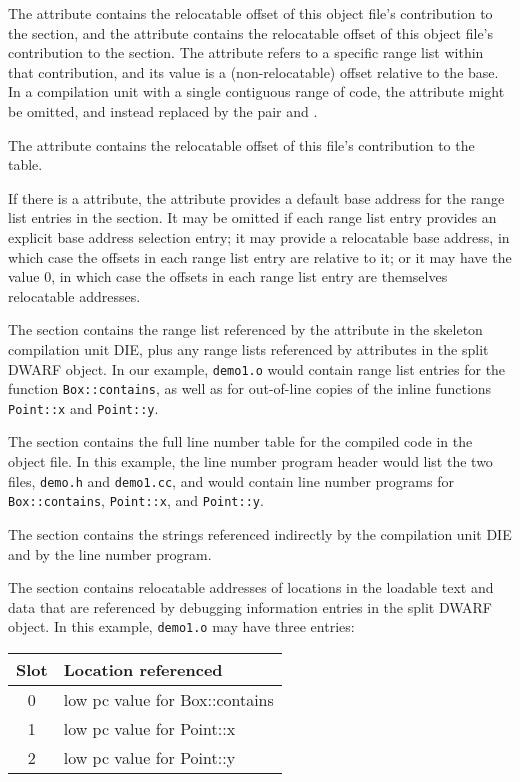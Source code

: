 The \DWATaddrbase{} attribute contains the relocatable offset of
this object file's contribution to the \dotdebugaddr{} section, and
the \DWATrangesbase{} attribute contains the relocatable offset
of this object file's contribution to the \dotdebugranges{} section.
The \DWATranges{} attribute refers to a specific range list within
that contribution, and its value is a (non-relocatable) offset
relative to the base. In a compilation unit with a single
contiguous range of code, the \DWATranges{} attribute might be
omitted, and instead replaced by the pair \DWATlowpc{} and
\DWAThighpc.

The \DWATstmtlist{} attribute contains the relocatable offset of
this file's contribution to the \dotdebugline{} table.

If there is a \DWATranges{} attribute, the \DWATlowpc{} attribute
provides a default base address for the range list entries in the
\dotdebugranges{} section. It may be omitted if each range list entry
provides an explicit base address selection entry; it may provide
a relocatable base address, in which case the offsets in each
range list entry are relative to it; or it may have the value 0,
in which case the offsets in each range list entry are themselves
relocatable addresses.

The \dotdebugranges{} section contains the range list referenced by
the \DWATranges{} attribute in the skeleton compilation unit DIE,
plus any range lists referenced by \DWATranges{} attributes in the
split DWARF object. In our example, \texttt{demo1.o} would contain range
list entries for the function \texttt{Box::contains}, as well as for
out-of-line copies of the inline functions \texttt{Point::x} and 
\texttt{Point::y}.

The \dotdebugline{} section contains the full line number table for
the compiled code in the object file. In this example, the line
number program header would list the two files, \texttt{demo.h} and
\texttt{demo1.cc}, and would contain line number programs for
\texttt{Box::contains}, \texttt{Point::x}, and \texttt{Point::y}.

The \dotdebugstr{} section contains the strings referenced indirectly
by the compilation unit DIE and by the line number program.

The \dotdebugaddr{} section contains relocatable addresses of
locations in the loadable text and data that are referenced by
debugging information entries in the split DWARF object. In this
example, \texttt{demo1.o} may have three entries:
\begin{center}
\begin{tabular}{cl}
Slot & Location referenced \\
\hline
   0   &  low pc value for Box::contains  \\
   1   &  low pc value for Point::x       \\
   2   &  low pc value for Point::y       \\
\end{tabular}
\end{center}

